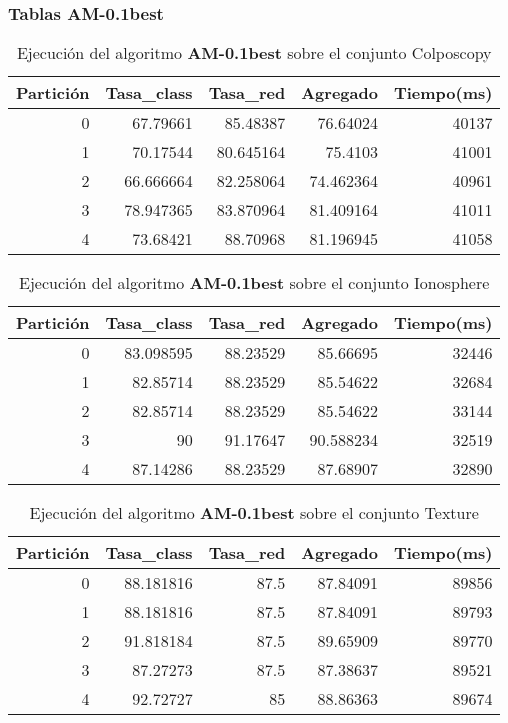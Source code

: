 \documentclass[size=a4, parskip=half, titlepage=false, toc=flat, toc=bib, 12pt]{scrartcl}
\begin{document}
\newpage

\subsubsection{Tablas AM-0.1best}

 \begin{table}[ht]
  \centering
  \begin{tabular}[t]{rrrrr}
  \toprule
  Partición &Tasa\_class &Tasa\_red & Agregado & Tiempo(ms)\\
  \midrule
0         & 67.79661  & 85.48387  & 76.64024  & 40137  \\
1         & 70.17544  & 80.645164 & 75.4103   & 41001  \\
2         & 66.666664 & 82.258064 & 74.462364 & 40961  \\
3         & 78.947365 & 83.870964 & 81.409164 & 41011  \\
4         & 73.68421  & 88.70968  & 81.196945 & 41058  \\
  \bottomrule
  \end{tabular}
  \caption{Ejecución del algoritmo \textbf{AM-0.1best} sobre el conjunto Colposcopy }
  \end{table}%

 \begin{table}[ht]
  \centering
  \begin{tabular}[t]{rrrrr}
  \toprule
  Partición &Tasa\_class &Tasa\_red & Agregado & Tiempo(ms)\\
  \midrule
0         & 83.098595 & 88.23529 & 85.66695  & 32446  \\
1         & 82.85714  & 88.23529 & 85.54622  & 32684  \\
2         & 82.85714  & 88.23529 & 85.54622  & 33144  \\
3         & 90        & 91.17647 & 90.588234 & 32519  \\
4         & 87.14286  & 88.23529 & 87.68907  & 32890  \\
  \bottomrule
  \end{tabular}
  \caption{Ejecución del algoritmo \textbf{AM-0.1best} sobre el conjunto Ionosphere}
  \end{table}%

 \begin{table}[ht]
  \centering
  \begin{tabular}[t]{rrrrr}
  \toprule
  Partición &Tasa\_class &Tasa\_red & Agregado & Tiempo(ms)\\
  \midrule
0         & 88.181816 & 87.5     & 87.84091 & 89856  \\
1         & 88.181816 & 87.5     & 87.84091 & 89793  \\
2         & 91.818184 & 87.5     & 89.65909 & 89770  \\
3         & 87.27273  & 87.5     & 87.38637 & 89521  \\
4         & 92.72727  & 85       & 88.86363 & 89674  \\
\bottomrule
  \end{tabular}
  \caption{Ejecución del algoritmo \textbf{AM-0.1best} sobre el conjunto Texture}
  \end{table}%
\end{document}
